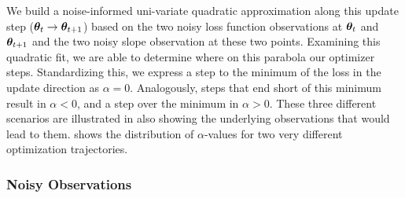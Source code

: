 We build a noise-informed uni-variate quadratic approximation along this update
step (${\bm{\theta}}_{t} \to {\bm{\theta}}_{t+1}$) based on the two noisy loss function
observations at ${\bm{\theta}}_{t}$ and ${\bm{\theta}}_{t+1}$ and the two noisy slope
observation at these two points. Examining this quadratic fit, we are able to
determine where on this parabola our optimizer steps. Standardizing this, we
express a step to the minimum of the loss in the update direction as $\alpha=0$.
Analogously, steps that end short of this minimum result in $\alpha<0$, and a
step over the minimum in $\alpha>0$. These three different scenarios are
illustrated in  also showing the underlying
observations that would lead to them.  shows the distribution of
$\alpha$-values for two very different optimization trajectories.

\subsubsection{Noisy Observations}

